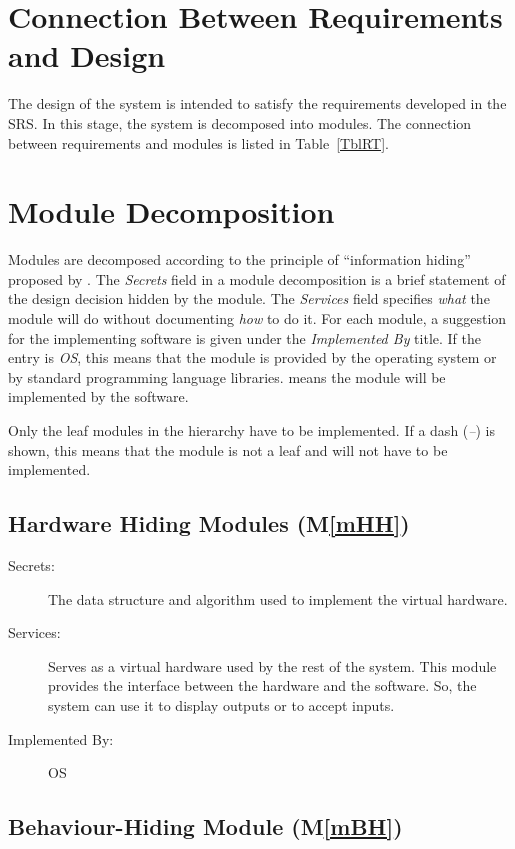 \documentclass[12pt, titlepage]{article}
\newcommand{\mref}[1]{M\ref{#1}}
\begin{document}
\section{Connection Between Requirements and Design} \label{SecConnection}

The design of the system is intended to satisfy the requirements developed in
the SRS. In this stage, the system is decomposed into modules. The connection
between requirements and modules is listed in Table~\ref{TblRT}.

\section{Module Decomposition} \label{SecMD}

Modules are decomposed according to the principle of ``information hiding''
proposed by \citet{ParnasEtAl1984}. The \emph{Secrets} field in a module
decomposition is a brief statement of the design decision hidden by the
module. The \emph{Services} field specifies \emph{what} the module will do
without documenting \emph{how} to do it. For each module, a suggestion for the
implementing software is given under the \emph{Implemented By} title. If the
entry is \emph{OS}, this means that the module is provided by the operating
system or by standard programming language libraries.  \emph{\progname{}} means the
module will be implemented by the \progname{} software.

Only the leaf modules in the hierarchy have to be implemented. If a dash
(\emph{--}) is shown, this means that the module is not a leaf and will not have
to be implemented.

\subsection{Hardware Hiding Modules (\mref{mHH})}

\begin{description}
\item[Secrets:]The data structure and algorithm used to implement the virtual
  hardware.
\item[Services:]Serves as a virtual hardware used by the rest of the
  system. This module provides the interface between the hardware and the
  software. So, the system can use it to display outputs or to accept inputs.
\item[Implemented By:] OS
\end{description}

\subsection{Behaviour-Hiding Module (\mref{mBH})}
\end{document}
